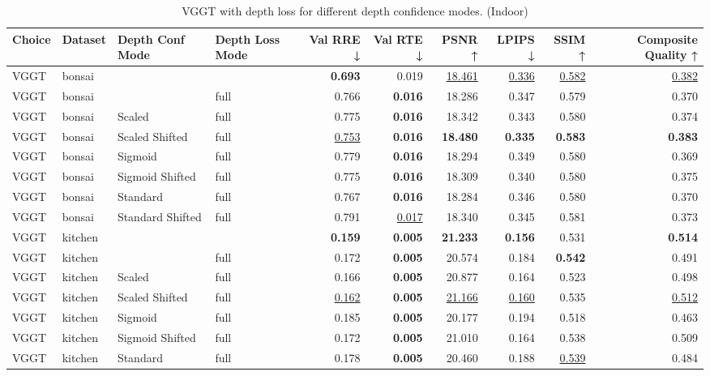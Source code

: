 \begin{table}[H]
\caption{\ifdefined\customcaption \customcaption \else VGGT with depth loss for different depth confidence modes. (Indoor) \fi}
\label{tab:05_depth_conf_mode_indoor}
\centering
\scriptsize
\begin{tabular}{llllrrrrrr}
\toprule
Choice & Dataset & Depth Conf Mode & Depth Loss Mode & Val RRE ↓ & Val RTE ↓ & PSNR ↑ & LPIPS ↓ & SSIM ↑ & Composite Quality ↑ \\
\midrule
VGGT & bonsai &  &  & \textbf{0.693} & 0.019 & \underline{18.461} & \underline{0.336} & \underline{0.582} & \underline{0.382} \\
VGGT & bonsai &  & full & 0.766 & \textbf{0.016} & 18.286 & 0.347 & 0.579 & 0.370 \\
VGGT & bonsai & Scaled & full & 0.775 & \textbf{0.016} & 18.342 & 0.343 & 0.580 & 0.374 \\
VGGT & bonsai & Scaled Shifted & full & \underline{0.753} & \textbf{0.016} & \textbf{18.480} & \textbf{0.335} & \textbf{0.583} & \textbf{0.383} \\
VGGT & bonsai & Sigmoid & full & 0.779 & \textbf{0.016} & 18.294 & 0.349 & 0.580 & 0.369 \\
VGGT & bonsai & Sigmoid Shifted & full & 0.775 & \textbf{0.016} & 18.309 & 0.340 & 0.580 & 0.375 \\
VGGT & bonsai & Standard & full & 0.767 & \textbf{0.016} & 18.284 & 0.346 & 0.580 & 0.370 \\
VGGT & bonsai & Standard Shifted & full & 0.791 & \underline{0.017} & 18.340 & 0.345 & 0.581 & 0.373 \\
\midrule
VGGT & kitchen &  &  & \textbf{0.159} & \textbf{0.005} & \textbf{21.233} & \textbf{0.156} & 0.531 & \textbf{0.514} \\
VGGT & kitchen &  & full & 0.172 & \textbf{0.005} & 20.574 & 0.184 & \textbf{0.542} & 0.491 \\
VGGT & kitchen & Scaled & full & 0.166 & \textbf{0.005} & 20.877 & 0.164 & 0.523 & 0.498 \\
VGGT & kitchen & Scaled Shifted & full & \underline{0.162} & \textbf{0.005} & \underline{21.166} & \underline{0.160} & 0.535 & \underline{0.512} \\
VGGT & kitchen & Sigmoid & full & 0.185 & \textbf{0.005} & 20.177 & 0.194 & 0.518 & 0.463 \\
VGGT & kitchen & Sigmoid Shifted & full & 0.172 & \textbf{0.005} & 21.010 & 0.164 & 0.538 & 0.509 \\
VGGT & kitchen & Standard & full & 0.178 & \textbf{0.005} & 20.460 & 0.188 & \underline{0.539} & 0.484 \\

\end{tabular}
\end{table}
